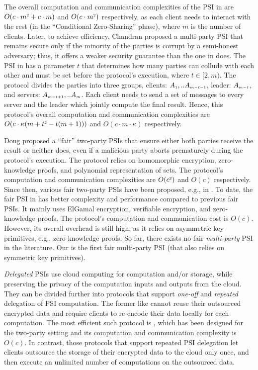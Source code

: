 The overall computation and communication complexities of the PSI in  \cite{DBLP:conf/ccs/KolesnikovMPRT17} are  $O(c\cdot m^{\scriptscriptstyle 2}+c\cdot m )$ and $O(c\cdot m^{\scriptscriptstyle 2})$ respectively, as each client needs to interact with the rest (in the ``Conditional Zero-Sharing'' phase), where $m$ is the number of clients. Later, to achieve efficiency, Chandran \et \cite{ChandranD0OSS21} proposed a multi-party PSI that remains secure only if the minority of the parties is corrupt by a semi-honest adversary; thus, it offers a weaker security guarantee than  the one in \cite{DBLP:conf/ccs/KolesnikovMPRT17} does. The PSI in \cite{NevoTY21} has a parameter $t$ that determines how many parties can collude with each other and must be set before the protocol's execution, where $t\in [2, m)$. The protocol divides the parties into three groups, clients: $A_{\scriptscriptstyle 1},..A_{\scriptscriptstyle m-t-1}$, leader: $A_{\scriptscriptstyle m-t}$, and servers: $A_{\scriptscriptstyle m-t+1},..A_{\scriptscriptstyle m}$. Each client needs to send a set of messages to every server and the leader which jointly compute the final result. Hence, this protocol's overall computation and communication complexities are $O(c\cdot \kappa(m+t^{\scriptscriptstyle 2}-t(m+1)))$ and $O(c\cdot m\cdot \kappa)$ respectively.


Dong \et proposed a ``fair'' two-party PSIs \cite{DBLP:conf/dbsec/DongCCR13} that ensure either both parties receive the result or neither does, even if a malicious party aborts prematurely during the protocol's execution. The protocol relies on homomorphic encryption,  zero-knowledge proofs, and polynomial representation of sets. The protocol's  computation and communication complexities are $O(c^{\scriptscriptstyle 2})$ and $O(c)$  respectively. Since then, various fair two-party PSIs have been proposed, e.g.,  in \cite{DebnathD14,DebnathD16-,DebnathD16}. To date, the fair PSI in \cite{DebnathD16} has better complexity and performance compared to previous fair PSIs. It mainly uses  ElGamal encryption, verifiable encryption, and zero-knowledge proofs. The protocol's computation and communication cost is $O(c)$. However, its overall overhead is still high, as it relies on asymmetric key primitives, e.g.,  zero-knowledge proofs. So far, there exists no fair \emph{multi-party} PSI in the literature. Our \withFai is the first  fair multi-party PSI (that also relies on symmetric key primitives).%


 \textit{Delegated} PSIs use  cloud computing  for computation and/or storage, while preserving the privacy of  the computation inputs and outputs from the cloud. They can be divided further into protocols that support \textit{one-off} and \textit{repeated} delegation of PSI computation. The former like \cite{kamarascaling,kerschbaum12,c18} cannot reuse their outsourced encrypted data and require clients to re-encode their data locally for each  computation. The most efficient such protocol is \cite{kamarascaling}, which has been designed for the two-party setting and its computation and communication complexity is $O(c)$.  In contrast, those protocols that support repeated PSI delegation let clients outsource the storage of their encrypted data to the cloud only once, and then execute an unlimited number of computations on the outsourced data. 
 
